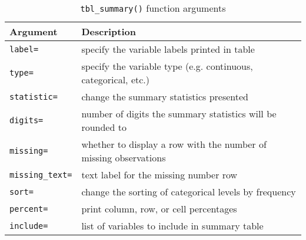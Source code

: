 \captionsetup[table]{labelformat=empty,skip=1pt}
\begin{longtable}{ll}
\caption{\label{tab:}\texttt{tbl\_summary()} function arguments}\\
\toprule
Argument & Description \\ 
\midrule
\texttt{label=} & specify the variable labels printed in table \\ 
\texttt{type=} & specify the variable type (e.g. continuous, categorical, etc.) \\ 
\texttt{statistic=} & change the summary statistics presented \\ 
\texttt{digits=} & number of digits the summary statistics will be rounded to \\ 
\texttt{missing=} & whether to display a row with the number of missing observations \\ 
\texttt{missing\_text=} & text label for the missing number row \\ 
\texttt{sort=} & change the sorting of categorical levels by frequency \\ 
\texttt{percent=} & print column, row, or cell percentages \\ 
\texttt{include=} & list of variables to include in summary table \\ 
\bottomrule
\end{longtable}

